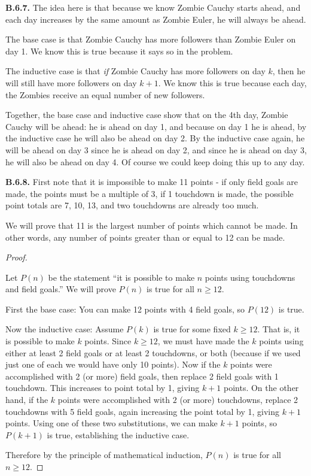 \documentclass[10pt,]{book}
\theoremstyle{plain}
\theoremstyle{definition}
\theoremstyle{definition}
\theoremstyle{definition}
\theoremstyle{definition}
\numberwithin{equation}{chapter}
\begin{document}
\par\smallskip
\noindent\textbf{B.6.7.} \hypertarget{p-2172}{}%
The idea here is that because we know Zombie Cauchy starts ahead, and each day increases by the same amount as Zombie Euler, he will always be ahead.%
\par
\hypertarget{p-2173}{}%
The base case is that Zombie Cauchy has more followers than Zombie Euler on day 1. We know this is true because it says so in the problem.%
\par
\hypertarget{p-2174}{}%
The inductive case is that \emph{if} Zombie Cauchy has more followers on day \(k\), then he will still have more followers on day \(k+1\). We know this is true because each day, the Zombies receive an equal number of new followers.%
\par
\hypertarget{p-2175}{}%
Together, the base case and inductive case show that on the 4th day, Zombie Cauchy will be ahead: he is ahead on day 1, and because on day 1 he is ahead, by the inductive case he will also be ahead on day 2. By the inductive case again, he will be ahead on day 3 since he is ahead on day 2, and since he is ahead on day 3, he will also be ahead on day 4. Of course we could keep doing this up to any day.%
\par\smallskip
\noindent\textbf{B.6.8.} \hypertarget{p-2177}{}%
First note that it is impossible to make 11 points - if only field goals are made, the points must be a multiple of 3, if 1 touchdown is made, the possible point totals are 7, 10, 13, \textellipsis{} and two touchdowns are already too much.%
\par
\hypertarget{p-2178}{}%
We will prove that 11 is the largest number of points which cannot be made. In other words, any number of points greater than or equal to 12 can be made.%
\begin{proof}\hypertarget{proof-47}{}
\hypertarget{p-2179}{}%
Let \(P(n)\) be the statement ``it is possible to make \(n\) points using touchdowns and field goals.'' We will prove \(P(n)\) is true for all \(n \ge 12\).%
\par
\hypertarget{p-2180}{}%
First the base case: You can make 12 points with 4 field goals, so \(P(12)\) is true.%
\par
\hypertarget{p-2181}{}%
Now the inductive case: Assume \(P(k)\) is true for some fixed \(k \ge 12\). That is, it is possible to make \(k\) points. Since \(k \ge 12\), we must have made the \(k\) points using either at least 2 field goals or at least 2 touchdowns, or both (because if we used just one of each we would have only 10 points). Now if the \(k\) points were accomplished with 2 (or more) field goals, then replace 2 field goals with 1 touchdown. This increases to point total by 1, giving \(k + 1\) points. On the other hand, if the \(k\) points were accomplished with \(2\) (or more) touchdowns, replace 2 touchdowns with 5 field goals, again increasing the point total by 1, giving \(k+1\) points. Using one of these two substitutions, we can make \(k+1\) points, so \(P(k+1)\) is true, establishing the inductive case.%
\par
\hypertarget{p-2182}{}%
Therefore by the principle of mathematical induction, \(P(n)\) is true for all \(n \ge 12\).%
\end{proof}
\end{document}
